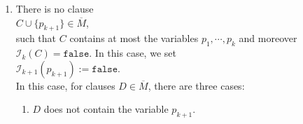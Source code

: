 \begin{enumerate}
\begin{enumerate}
\begin{enumerate}[1.]
          Since we defined $\mathcal{I}_{k+1}(p_{k+1})$ as $\texttt{true}$, $\mathcal{I}_{k+1}(D) = \mathtt{true}$ holds.
    \item Case: $(\neg p_{k+1}) \in D$.

          Then $D$ has the form
          \\[0.2cm]
          \hspace*{1.3cm}
          $D = E \cup \{ \neg p_{k+1} \}$.
          \\[0.2cm]
          At this point, we need the fact that $\overline{M}$ is saturated. We apply the
          cut rule to the clauses $C \cup \{ p_{k+1} \}$ and $E \cup \{ \neg p_{k+1} \}$:
          \\[0.2cm]
          \hspace*{1.3cm}
          $C \cup \{ p_{k+1} \},\quad E \cup \{ \neg p_{k+1} \} \quad\vdash\quad C \cup E$
          \\[0.2cm]
          Since $\overline{M}$ is saturated, $C\cup E \in \overline{M}$. $C \cup E$ contains only the
          variables $p_1,\cdots, p_k$. Therefore by the induction hypothesis,
          \\[0.2cm]
          \hspace*{1.3cm}
          $\mathcal{I}_{k+1}(C \cup E) = \mathcal{I}_{k}(C \cup E) = \mathtt{true}$.
          \\[0.2cm]
          Since $\mathcal{I}_k(C) = \mathtt{false}$, $\mathcal{I}_k(E) = \mathtt{true}$ must hold. Thus
          we have
          \\[0.2cm]
          \hspace*{1.3cm}
          $
          \begin{array}[t]{lcl}
            \mathcal{I}_{k+1}(D) & = & \mathcal{I}_{k+1}\bigl(E \cup \{ \neg p_{k+1} \bigr\}) \\
                                & = & \mathcal{I}_k(E) \;\circvee\;\; \mathcal{I}_{k+1}(\neg p_{k+1}) \\
                                & = & \mathtt{true} \;\circvee\;\; \mathtt{false} = \mathtt{true}
          \end{array}
          $
          \\[0.2cm]
          and that was to be shown.
    \end{enumerate}
  \item There is no clause
    \\[0.2cm]
    \hspace*{1.3cm}
    $C \cup \{p_{k+1}\} \in \overline{M}$,
    \\[0.2cm]
    such that $C$ contains at most the variables $p_1,\cdots,p_k$ and moreover $\mathcal{I}_k(C) = \mathtt{false}$.
    In this case, we set
    \\[0.2cm]
    \hspace*{1.3cm}
    $\mathcal{I}_{k+1}(p_{k+1}) := \mathtt{false}$.
    \\[0.2cm]    
    In this case, for clauses $D \in \overline{M}$, there are three cases:
    \begin{enumerate}[1.]
    \item $D$ does not contain the variable $p_{k+1}$.
      

\end{enumerate}
\end{enumerate}
\end{enumerate}
